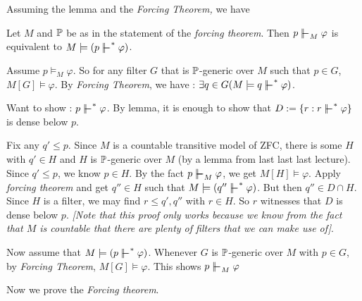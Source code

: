 \documentclass[12pt,a4paper]{article}
\newenvironment{proof}
{\begin{changemargin}{0.5cm}{0.5cm} 
	}%
	{\end{changemargin}
}
\newenvironment{p}
{\begin{proof} 
	}%
	{\end{proof}
}
\begin{document}
Assuming the lemma and the \emph{Forcing Theorem,} we have
\s

\corr Let $M$ and $\mathbb{P}$ be as in the statement of the \emph{forcing theorem}. Then $p\forces_M \varphi$ is equivalent to $M\models (p\forces^* \varphi)$.
\begin{p}
\pf Assume $p\models_M \varphi$. So for any filter $G$ that is $\mathbb{P}$-generic over $M$ such that $p\in G$, $M[G] \models \varphi$. By \emph{Forcing Theorem}, we have : $\exists q\in G(M\models q\forces^* \varphi)$.

\quad Want to show : $p\forces^* \varphi$. By lemma, it is enough to show that $D:=\{r : r\forces^* \varphi \}$ is dense below $p$.

\quad Fix any $q' \leq p$. Since $M$ is a countable transitive model of ZFC, there is some $H$ with $q'\in H$ and $H$ is $\mathbb{P}$-generic over $M$ (by a lemma from last last last lecture). Since $q'\leq p$, we know $p\in H$. By the fact $p\forces_M \varphi$, we get $M[H] \models \varphi$. Apply \emph{forcing theorem} and get $q''\in H$ such that $M \models (q'' \forces^* \varphi)$. But then  $q'' \in D \cap H$. Since $H$ is a filter, we may find $r \leq q', q''$ with $r\in H$. So $r$ witnesses that $D$ is dense below $p$. \emph{[Note that this proof only works because we know from the fact that $M$ is countable that there are plenty of filters that we can make use of]}.
\s

Now assume that $M\models (p\forces^* \varphi)$. Whenever $G$ is $\mathbb{P}$-generic over $M$ with $p\in G$, by \emph{Forcing Theorem}, $M[G] \models \varphi$. This shows $p\forces_M \varphi$

\eop  
\end{p}
\s

Now we prove the \emph{Forcing theorem}.
\s
\end{document}

